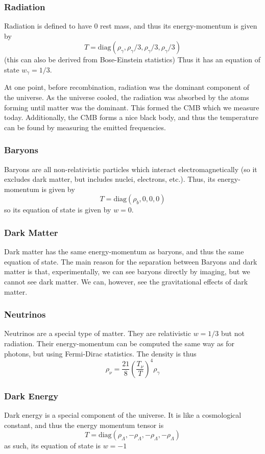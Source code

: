 \subsubsection{Radiation}
Radiation is defined to have 0 rest mass, and thus its energy-momentum is given by
\begin{equation}
    T = \text{diag}(\rho_\gamma, \rho_\gamma/3, \rho_\gamma/3, \rho_\gamma/3)
\end{equation}
(this can also be derived from Bose-Einstein statistics) Thus it has an equation of state $w_\gamma=1/3$. 

At one point, before recombination, radiation was the dominant component of the universe. As the universe cooled, the radiation was absorbed by the atoms forming until matter was the dominant. This formed the CMB which we measure today. Additionally, the CMB forms a nice black body, and thus the temperature can be found by measuring the emitted frequencies.
\subsubsection{Baryons}
Baryons are all non-relativistic particles which interact electromagnetically (so it excludes dark matter, but includes nuclei, electrons, etc.). Thus, its energy-momentum is given by
\begin{equation}
    T = \text{diag}(\rho_b,0,0,0)
\end{equation}
so its equation of state is given by $w=0$.
\subsubsection{Dark Matter}
Dark matter has the same energy-momentum as baryons, and thus the same equation of state. The main reason for the separation between Baryons and dark matter is that, experimentally, we can see baryons directly by imaging, but we cannot see dark matter. We can, however, see the gravitational effects of dark matter.
\subsubsection{Neutrinos}
Neutrinos are a special type of matter. They are relativistic $w=1/3$ but not radiation. Their energy-momentum can be computed the same way as for photons, but using Fermi-Dirac statistics. The density is thus
\begin{equation}
    \rho_\nu = \frac{21}{8}\left(\frac{T_\nu}{T}\right)^4\rho_\gamma
\end{equation}
\subsubsection{Dark Energy}
Dark energy is a special component of the universe. It is like a cosmological constant, and thus the energy momentum tensor is
\begin{equation}
    T = \text{diag}(\rho_\Lambda,-\rho_\Lambda,-\rho_\Lambda,-\rho_\Lambda)
\end{equation}
as such, its equation of state is $w=-1$
